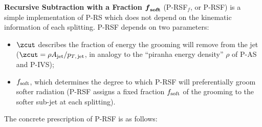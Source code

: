 \documentclass[letterpaper,11pt]{article}
\begin{document}
\textbf{Recursive Subtraction with a Fraction \(\boldsymbol{f}_{\rm\bf soft}\)} (P-RSF\(_f\), or P-RSF) is a simple implementation of P-RS which does not depend on the kinematic information of each splitting.
%
P-RSF depends on two parameters:
%
\begin{itemize}
    \item
    \(\zcut\) describes the fraction of energy the grooming will remove from the jet (\(\zcut = \rho A_{\rm jet} / p_{T,\,\rm jet}\), in analogy to the ``piranha energy density'' \(\rho\) of P-AS and P-IVS);

    \item
    \(f_{\rm soft}\), which determines the degree to which P-RSF will preferentially groom softer radiation (P-RSF assigns a fixed fraction \(f_{\rm soft}\) of the grooming to the softer sub-jet at each splitting).
\end{itemize}
%
The concrete prescription of P-RSF is as follows:
\end{document}
